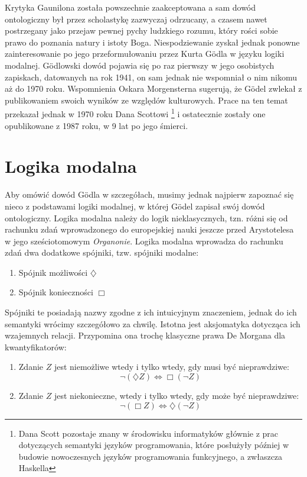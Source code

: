 \documentclass{article}
\begin{document}
Krytyka Gaunilona została powszechnie zaakceptowana a sam dowód ontologiczny był przez scholastykę zazwyczaj odrzucany, a czasem nawet postrzegany jako przejaw pewnej pychy ludzkiego rozumu, który rości sobie prawo do poznania natury i istoty Boga. Niespodziewanie zyskał jednak ponowne zainteresowanie po jego przeformułowaniu przez Kurta Gödla w języku logiki modalnej. Gödlowski dowód pojawia się po raz pierwszy w jego osobistych zapiskach, datowanych na rok 1941, on sam jednak nie wspomniał o nim nikomu aż do 1970 roku. Wspomnienia Oskara Morgensterna sugerują, że Gödel zwlekał z publikowaniem swoich wyników ze względów kulturowych. Prace na ten temat przekazał jednak w 1970 roku Dana Scottowi \footnote{Dana Scott pozostaje znany w środowisku informatyków głównie z prac dotyczących semantyki języków programowania, które posłużyły później w budowie nowoczesnych języków programowania funkcyjnego, a zwłaszcza Haskella} i ostatecznie zostały one opublikowane z 1987 roku, w 9 lat po jego śmierci. 

\section{Logika modalna}

Aby omówić dowód Gödla w szczegółach, musimy jednak najpierw zapoznać się nieco z podstawami logiki modalnej, w której Gödel zapisał swój dowód ontologiczny. Logika modalna należy do logik nieklasycznych, tzn. różni się od rachunku zdań wprowadzonego do europejskiej nauki jeszcze przed Arystotelesa w jego sześciotomowym \emph{Organonie}. Logika modalna wprowadza do rachunku zdań dwa dodatkowe spójniki, tzw. spójniki modalne:
\begin{enumerate}
	\item Spójnik możliwości $\diamondsuit$
	\item Spójnik konieczności $\Box$
\end{enumerate}

Spójniki te posiadają nazwy zgodne z ich intuicyjnym znaczeniem, jednak do ich semantyki wrócimy szczegółowo za chwilę. Istotna jest aksjomatyka dotycząca ich wzajemnych relacji. Przypomina ona trochę klasyczne prawa De Morgana dla kwantyfikatorów: 

\begin{enumerate}
	\item Zdanie $Z$ jest niemożliwe wtedy i tylko wtedy, gdy musi być nieprawdziwe:
	\begin{equation} \label{eq:de-morgan1}
	\neg \left( \diamondsuit Z \right) \Leftrightarrow \Box \left( \neg Z \right)
	\end{equation}
	\item Zdanie $Z$ jest niekonieczne, wtedy i tylko wtedy, gdy może być nieprawdziwe:
	\begin{equation} \label{eq:de-morgan2}
	\neg \left( \Box Z \right) \Leftrightarrow \diamondsuit \left( \neg Z \right)
	\end{equation}
\end{enumerate}
\end{document}
